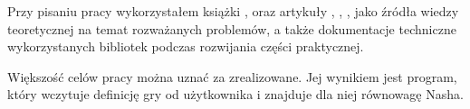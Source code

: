 \documentclass[polish]{standalone}
\begin{document}
Przy pisaniu pracy wykorzystałem książki \cite{FT-GT}, \cite{O-GT} oraz artykuły \cite{LH-NE}, \cite{PNS-NE}, \cite{SCG-NE}, \cite{SCARF-NR} jako źródła wiedzy teoretycznej na temat rozważanych problemów, a także dokumentacje techniczne wykorzystanych bibliotek podczas rozwijania części praktycznej.

Większość celów pracy można uznać za zrealizowane. Jej wynikiem jest program, który wczytuje definicję gry od użytkownika i znajduje dla niej równowagę Nasha.
\end{document}
